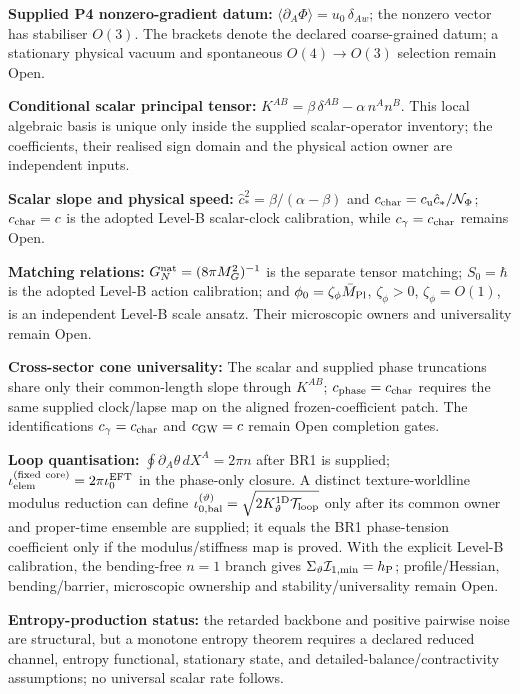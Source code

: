 \documentclass[11pt,a4paper]{article}
\begin{document}
\textbf{Supplied P4 nonzero-gradient datum:}
$\langle\partial_A\Phi\rangle = u_0\,\delta_{Aw}$; the nonzero vector has stabiliser $O(3)$.  The brackets denote the declared coarse-grained datum; a stationary physical vacuum and spontaneous $O(4)\to O(3)$ selection remain Open.

\textbf{Conditional scalar principal tensor:}
$K^{AB} = \beta\,\delta^{AB} - \alpha\,n^An^B$.  This local algebraic basis is unique only inside the supplied scalar-operator inventory; the coefficients, their realised sign domain and the physical action owner are independent inputs.

\textbf{Scalar slope and physical speed:}
$\hat c_*^2=\beta/(\alpha-\beta)$ and $c_{\rm char}=c_{\rm u}\hat c_*/\mathcal N_\Phi$; $c_{\rm char}=c$ is the adopted Level-B scalar-clock calibration, while $c_\gamma=c_{\rm char}$ remains Open.

\textbf{Matching relations:}
$G_N^{\rm nat}=(8\pi M_G^2)^{-1}$ is the separate tensor matching;
$S_0=\hbar$ is the adopted Level-B action calibration; and
$\phi_0=\zeta_\phi\bar M_{\rm Pl}$, $\zeta_\phi>0$,
$\zeta_\phi=O(1)$, is an independent Level-B scale ansatz.  Their microscopic
owners and universality remain Open.

\textbf{Cross-sector cone universality:}
The scalar and supplied phase truncations share only their common-length slope through $K^{AB}$; $c_{\rm phase}=c_{\rm char}$ requires the same supplied clock/lapse map on the aligned frozen-coefficient patch.  The identifications $c_\gamma=c_{\rm char}$ and $c_{\rm GW}=c$ remain Open completion gates.

\textbf{Loop quantisation:}
$\oint \partial_A\theta\,dX^A=2\pi n$ after BR1 is supplied; \quad $\iota_{\rm elem}^{\rm(fixed\ core)}=2\pi \iota_0^{\rm EFT}$ in the phase-only closure.  A distinct texture-worldline modulus reduction can define $\iota_{0,\rm bal}^{(\vartheta)}=\sqrt{2K_\vartheta^{1\mathrm D}\mathcal T_{\rm loop}}$ only after its common owner and proper-time ensemble are supplied; it equals the BR1 phase-tension coefficient only if the modulus/stiffness map is proved.  With the explicit Level-B calibration, the bending-free $n=1$ branch gives $\Sigma_\vartheta\mathcal I_{1,\min}=h_{\rm P}$; profile/Hessian, bending/barrier, microscopic ownership and stability/universality remain Open.

\textbf{Entropy-production status:}
the retarded backbone and positive pairwise noise are structural, but a monotone entropy theorem requires a declared reduced channel, entropy functional, stationary state, and detailed-balance/contractivity assumptions; no universal scalar rate follows.
\end{document}

